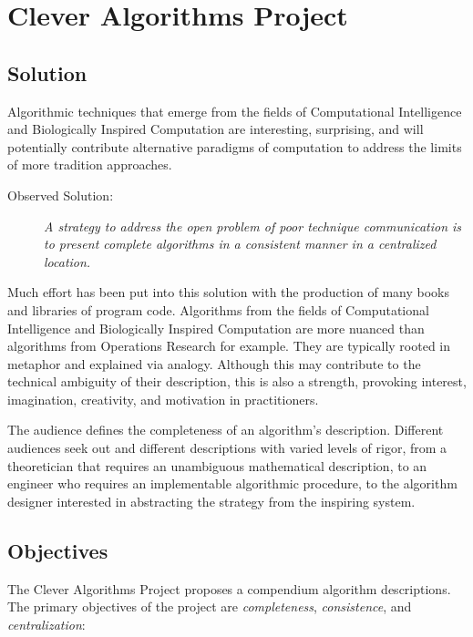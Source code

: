 \documentclass[a4paper, 11pt]{article}
\begin{document}
\section{Clever Algorithms Project}
\label{sec:project}

\subsection{Solution}
Algorithmic techniques that emerge from the fields of Computational Intelligence and Biologically Inspired Computation are interesting, surprising, and will potentially contribute alternative paradigms of computation to address the limits of more tradition approaches. 

\begin{description}
	\item[Observed Solution:]\emph{A strategy to address the open problem of poor technique communication is to present complete algorithms in a consistent manner in a centralized location.} 
\end{description}

Much effort has been put into this solution with the production of many books and libraries of program code. Algorithms from the fields of Computational Intelligence and Biologically Inspired Computation are more nuanced than algorithms from Operations Research for example. They are typically rooted in metaphor and explained via analogy. Although this may contribute to the technical ambiguity of their description, this is also a strength, provoking interest, imagination, creativity, and motivation in practitioners. 

The audience defines the completeness of an algorithm's description. Different audiences seek out and different descriptions with varied levels of rigor, from a theoretician that requires an unambiguous mathematical description, to an engineer who requires an implementable algorithmic procedure, to the algorithm designer interested in abstracting the strategy from the inspiring system. 

\subsection{Objectives}
The Clever Algorithms Project proposes a compendium algorithm descriptions. The primary objectives of the project are \emph{completeness}, \emph{consistence}, and \emph{centralization}:
\end{document}
